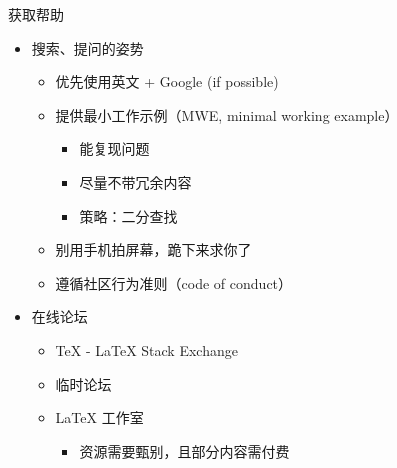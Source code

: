 \begin{frame}{获取帮助}
  \begin{itemize}
    \item<+-> 搜索、提问的姿势
  
      \begin{itemize}
        \item 优先使用英文 + Google (if possible)
        \item 提供最小工作示例（MWE, minimal working example）
          \begin{itemize}
            \item 能复现问题
            \item 尽量不带冗余内容
            \item 策略：二分查找
          \end{itemize}
        \item 别用手机拍屏幕\alert{，跪下来求你了}
        \item 遵循社区行为准则（code of conduct）
      \end{itemize}
  
    \item<+-> 在线论坛
  
      \begin{itemize}
        \item \TeX{} - \LaTeX{} Stack Exchange 
        \item \CTeX{} 临时论坛 
        \item \LaTeX{} 工作室 
          \begin{itemize}
            \item 资源需要甄别，且部分内容需付费
          \end{itemize}
      \end{itemize}
  \end{itemize}
\end{frame}

